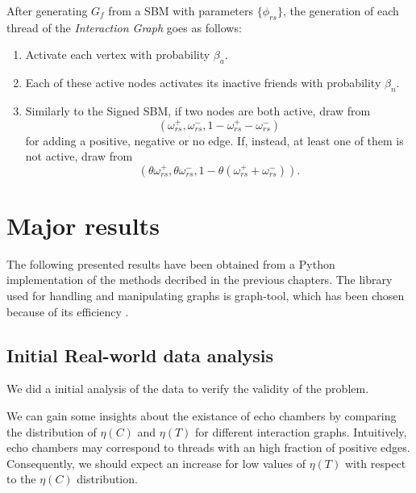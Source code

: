 \bigskip
After generating $G_f$ from a SBM with parameters $\{\phi_{rs} \}$, the
generation of each thread of the \emph{Interaction Graph} goes as
follows:

\begin{enumerate}
	\item Activate each vertex with probability $\beta_{a}  $.
	\item Each of these active nodes activates its inactive friends with
	      probability $\beta_n$.
	\item Similarly to the Signed SBM, if two nodes are both active, draw
	      from
	      \begin{equation*}
		      (\omega _{rs} ^{+}, \omega _{rs} ^{-}, 1 - \omega _{rs} ^{+} -
		      \omega _{rs} ^{-})
	      \end{equation*}
	      for adding a positive, negative or no edge. If, instead, at least one
	      of them is not active, draw from
	      \begin{equation*}
		      (\theta \omega _{rs} ^{+}, \theta \omega _{rs} ^{-}, 1
		      - \theta (\omega _{rs} ^{+} + \omega _{rs} ^{-})).
	      \end{equation*}
\end{enumerate}

\section{Major results}

The following presented results have been obtained from a Python
implementation of the methods decribed in the previous chapters. The library used
for handling and manipulating graphs is graph-tool, which has been chosen
because of its efficiency \cite{peixoto_graph-tool_2014}.

\subsection{Initial Real-world data analysis}%
\label{sub:validity_problem_definition}

We did a initial analysis of the data to verify the validity of the problem.

We can gain some insights about the existance of echo chambers by comparing
the distribution of $\eta(C)$ and $\eta(T)$ for different interaction graphs.
Intuitively, echo chambers may correspond to threads with an
high fraction of positive edges. Consequently, we should expect an increase
for low values of $\eta(T)$ with respect to the $\eta(C)$ distribution.

